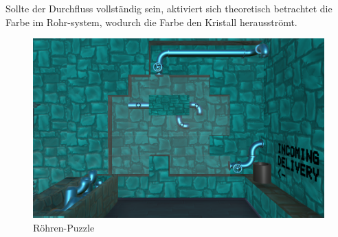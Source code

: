 Sollte der Durchfluss vollständig sein, aktiviert sich theoretisch betrachtet die Farbe im Rohr-system, wodurch die Farbe den Kristall herausströmt.
\begin{figure}[h]
	\centering
	\includegraphics[width=\textwidth/2]{Pictures/Roehren}
	\caption{Röhren-Puzzle}
	\label{fig:cyan}
\end{figure}\\
